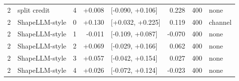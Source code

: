 \begin{table}[ht]
\begin{tabular}{cllrlrrl}
2 & split credit & 4 & +0.008 & [-0.090, +0.106] & 0.228 & 400 & none \\
2 & ShapeLLM-style & 0 & +0.130 & [+0.032, +0.225] & 0.119 & 400 & channel \\
2 & ShapeLLM-style & 1 & -0.011 & [-0.109, +0.087] & -0.070 & 400 & none \\
2 & ShapeLLM-style & 2 & +0.069 & [-0.029, +0.166] & 0.062 & 400 & none \\
2 & ShapeLLM-style & 3 & +0.057 & [-0.042, +0.154] & 0.027 & 400 & none \\
2 & ShapeLLM-style & 4 & +0.026 & [-0.072, +0.124] & -0.023 & 400 & none \\
\bottomrule
\end{tabular}
\end{table}
